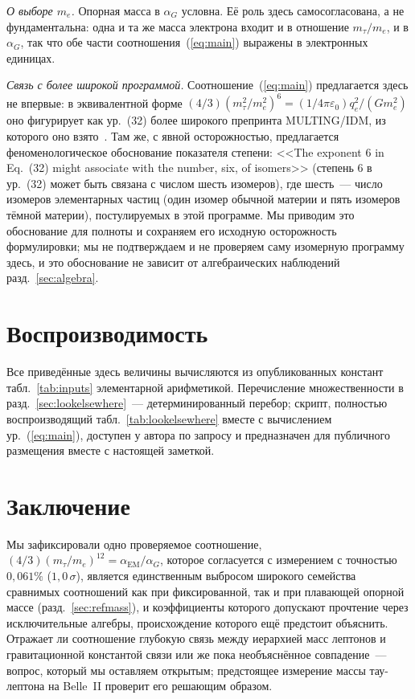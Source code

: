 \documentclass[aps,prd,twocolumn,amsmath,amssymb,floatfix,nofootinbib]{revtex4-2}
\begin{document}
\emph{О выборе $m_e$.} Опорная масса в $\alpha_G$ условна. Её роль здесь
самосогласована, а не фундаментальна: одна и та же масса электрона входит и
в отношение $m_\tau/m_e$, и в $\alpha_G$, так что обе части
соотношения~(\ref{eq:main}) выражены в электронных единицах.

\emph{Связь с более широкой программой.} Соотношение~(\ref{eq:main})
предлагается здесь не впервые: в эквивалентной форме
$(4/3)(m_\tau^2/m_e^2)^6 = (1/4\pi\varepsilon_0)q_e^2/(Gm_e^2)$ оно фигурирует
как ур.~(32) более широкого препринта MULTING/IDM, из которого оно
взято~\cite{buckholtzv6}. Там же, с явной осторожностью, предлагается
феноменологическое обоснование показателя степени: <<The exponent 6 in
Eq.~(32) might associate with the number, six, of isomers>> (степень 6 в
ур.~(32) может быть связана с числом шесть изомеров), где шесть~---
число изомеров элементарных частиц (один изомер обычной материи и пять
изомеров тёмной материи), постулируемых в этой программе. Мы приводим это
обоснование для полноты и сохраняем его исходную осторожность формулировки;
мы не подтверждаем и не проверяем саму изомерную программу здесь, и это
обоснование не зависит от алгебраических наблюдений
разд.~\ref{sec:algebra}.

\section{Воспроизводимость}

Все приведённые здесь величины вычисляются из опубликованных констант
табл.~\ref{tab:inputs} элементарной арифметикой. Перечисление множественности
в разд.~\ref{sec:lookelsewhere}~--- детерминированный перебор; скрипт,
полностью воспроизводящий табл.~\ref{tab:lookelsewhere} вместе с вычислением
ур.~(\ref{eq:main}), доступен у автора по запросу и предназначен для
публичного размещения вместе с настоящей заметкой.

\section{Заключение}

Мы зафиксировали одно проверяемое соотношение,
$(4/3)(m_\tau/m_e)^{12} = \alpha_{\mathrm{EM}}/\alpha_G$, которое согласуется
с измерением с точностью $0{,}061\%$ ($1{,}0\,\sigma$), является единственным
выбросом широкого семейства сравнимых соотношений как при фиксированной,
так и при плавающей опорной массе (разд.~\ref{sec:refmass}), и
коэффициенты которого допускают прочтение через исключительные алгебры,
происхождение которого ещё предстоит объяснить. Отражает ли соотношение
глубокую связь между иерархией масс
лептонов и гравитационной константой связи или же пока необъяснённое
совпадение~--- вопрос, который мы оставляем открытым; предстоящее измерение
массы тау-лептона на Belle~II проверит его решающим образом.
\end{document}
